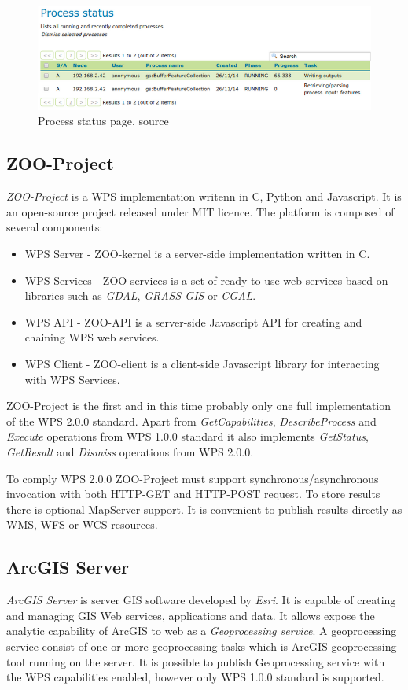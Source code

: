 \begin{figure}[h!]
\centering
\includegraphics[width=\textwidth]{img/geoserver_status.png}
\caption{Process status page, source \cite{GS_docs}}
\label{fig:geoserver_status}
\end{figure}

\subsection{ZOO-Project}
\textit{ZOO-Project} is a WPS implementation writenn in C, Python and Javascript. It is an open-source project released under MIT licence.
The platform is composed of several components:

\begin{itemize}
\item WPS Server - ZOO-kernel is a server-side implementation written in C.
\item WPS Services - ZOO-services is a set of ready-to-use web services based on libraries such as \textit{GDAL}, \textit{GRASS GIS}
or \textit{CGAL}.
\item WPS API - ZOO-API is a server-side Javascript API for creating and chaining WPS web services.
\item WPS Client - ZOO-client is a client-side Javascript library for interacting with WPS Services.
\end{itemize}

ZOO-Project is the first and in this time probably only one full implementation of the WPS 2.0.0 standard. Apart from \textit{GetCapabilities},
\textit{DescribeProcess} and \textit{Execute} operations from WPS 1.0.0 standard it also implements \textit{GetStatus}, \textit{GetResult}
and \textit{Dismiss} operations from WPS 2.0.0.

To comply WPS 2.0.0 ZOO-Project must support synchronous/asynchronous invocation with both HTTP-GET and HTTP-POST request. To store 
results there is optional MapServer support. It is convenient to publish results directly as WMS, WFS or WCS resources.

\subsection{ArcGIS Server}
\textit{ArcGIS Server} is server GIS software developed by \textit{Esri}. It is capable of creating and managing GIS Web services, applications and data. It allows expose the analytic capability of ArcGIS to web as a \textit{Geoprocessing service}. A geoprocessing
service consist of one or more geoprocessing tasks which is ArcGIS geoprocessing tool running on the server. It is possible to publish Geoprocessing service with the WPS capabilities enabled, however only WPS 1.0.0 standard is supported.

